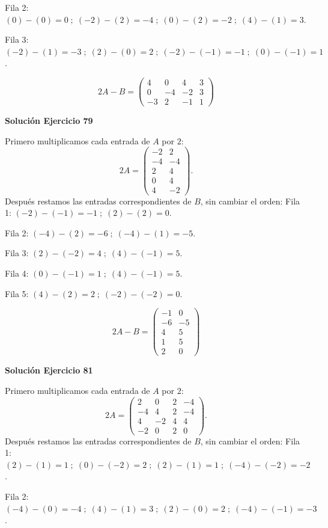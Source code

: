 \documentclass[12pt]{article}
\begin{document}
Fila 2: $(0)-(0)=0\; ;\; (-2)-(2)=-4\; ;\; (0)-(2)=-2\; ;\; (4)-(1)=3$.

Fila 3: $(-2)-(1)=-3\; ;\; (2)-(0)=2\; ;\; (-2)-(-1)=-1\; ;\; (0)-(-1)=1$.

\[
\boxed{2A-B=\begin{pmatrix}4&0&4&3\\0&-4&-2&3\\-3&2&-1&1\end{pmatrix}}
\]

\par\bigskip\noindent\textbf{Solución Ejercicio 79}\par\nobreak
Primero multiplicamos cada entrada de $A$ por $2$:
\[
2A=\begin{pmatrix}-2&2\\-4&-4\\2&4\\0&4\\4&-2\end{pmatrix}.
\]
Después restamos las entradas correspondientes de $B$, sin cambiar el orden:
Fila 1: $(-2)-(-1)=-1\; ;\; (2)-(2)=0$.

Fila 2: $(-4)-(2)=-6\; ;\; (-4)-(1)=-5$.

Fila 3: $(2)-(-2)=4\; ;\; (4)-(-1)=5$.

Fila 4: $(0)-(-1)=1\; ;\; (4)-(-1)=5$.

Fila 5: $(4)-(2)=2\; ;\; (-2)-(-2)=0$.

\[
\boxed{2A-B=\begin{pmatrix}-1&0\\-6&-5\\4&5\\1&5\\2&0\end{pmatrix}}
\]

\par\bigskip\noindent\textbf{Solución Ejercicio 81}\par\nobreak
Primero multiplicamos cada entrada de $A$ por $2$:
\[
2A=\begin{pmatrix}2&0&2&-4\\-4&4&2&-4\\4&-2&4&4\\-2&0&2&0\end{pmatrix}.
\]
Después restamos las entradas correspondientes de $B$, sin cambiar el orden:
Fila 1: $(2)-(1)=1\; ;\; (0)-(-2)=2\; ;\; (2)-(1)=1\; ;\; (-4)-(-2)=-2$.

Fila 2: $(-4)-(0)=-4\; ;\; (4)-(1)=3\; ;\; (2)-(0)=2\; ;\; (-4)-(-1)=-3$.
\end{document}
